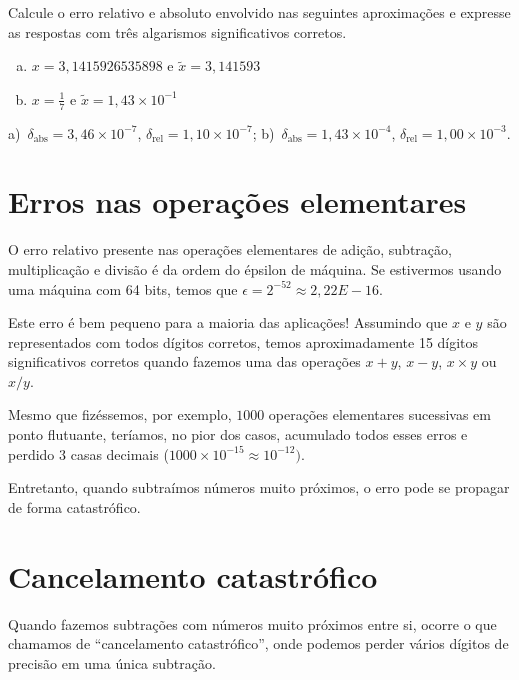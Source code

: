 \begin{exer} Calcule o erro relativo e absoluto envolvido nas seguintes aproximações e expresse as respostas com três algarismos significativos corretos.
    \begin{enumerate}[a)]
    \item $x=3,1415926535898$ e $\tilde{x}=3,141593$
    \item $x=\frac{1}{7}$ e $\tilde{x}=1,43\times 10^{-1}$
    \end{enumerate}
\end{exer}
\begin{resp}
    a)~$\delta_{\mbox{abs}}=3,46\times 10^{-7}$, $\delta_{\mbox{rel}}=1,10\times 10^{-7}$; b)~$\delta_{\mbox{abs}}=1,43\times 10^{-4}$, $\delta_{\mbox{rel}} = 1,00 \times 10^{-3}$.
\end{resp}



\section{Erros nas operações elementares}
O erro relativo presente nas operações elementares de adição, subtração, multiplicação e divisão é da ordem do épsilon de máquina. Se estivermos usando uma máquina com 64 bits, temos que $\epsilon = 2^{-52} \approx 2,22E-16$.

Este erro é bem pequeno para a maioria das aplicações! Assumindo que $x$ e $y$ são representados com todos dígitos corretos, temos aproximadamente 15 dígitos significativos corretos quando fazemos uma das operações $x+y$, $x-y$, $x\times y$ ou $x/y$.


Mesmo que fizéssemos, por exemplo, $1000$ operações elementares sucessivas em ponto flutuante, teríamos, no pior dos casos, acumulado todos esses erros e perdido $3$ casas decimais ($1000\times 10^{-15} \approx 10^{-12})$.

Entretanto, quando subtraímos números muito próximos, o erro pode se propagar de forma catastrófico.

\section{Cancelamento catastrófico}

Quando fazemos subtrações com números muito próximos entre si, ocorre o que chamamos de ``cancelamento catastrófico'', onde podemos perder vários dígitos de precisão em uma única subtração.

